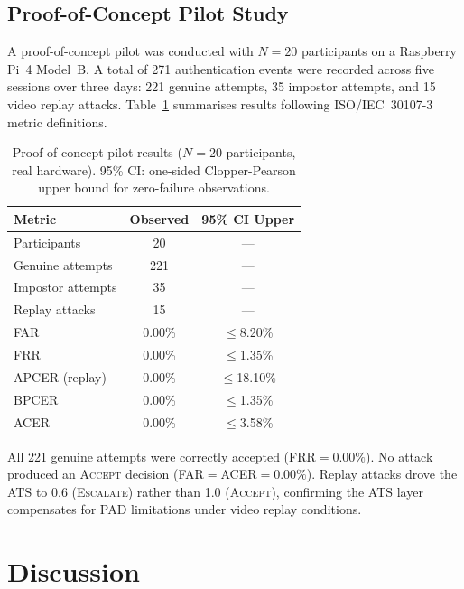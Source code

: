 \documentclass[submission]{sacjsub}
\begin{document}
\subsection{Proof-of-Concept Pilot Study}\label{sec:pilot}

A proof-of-concept pilot was conducted with \(N{=}20\) participants
on a Raspberry Pi~4 Model~B. A total of 271 authentication events were
recorded across five sessions over three days: 221 genuine attempts,
35 impostor attempts, and 15 video replay attacks.
Table~\ref{tab:pilot} summarises results following ISO/IEC~30107-3
metric definitions.

\begin{table}[t]
\caption{Proof-of-concept pilot results (\(N{=}20\) participants, real
  hardware). 95\% CI: one-sided Clopper-Pearson upper bound for
  zero-failure observations.}
\label{tab:pilot}
\begin{tabular}{|l|c|c|}
  \hline
  Metric & Observed & 95\% CI Upper \\
  \hline
  Participants       & 20          & --- \\
  Genuine attempts   & 221         & --- \\
  Impostor attempts  & 35          & --- \\
  Replay attacks     & 15          & --- \\
  \hline
  FAR                & 0.00\%  & \(\leq\)8.20\% \\
  FRR                & 0.00\%  & \(\leq\)1.35\% \\
  APCER (replay)     & 0.00\%  & \(\leq\)18.10\% \\
  BPCER              & 0.00\%  & \(\leq\)1.35\% \\
  ACER               & 0.00\%  & \(\leq\)3.58\% \\
  \hline
\end{tabular}
\end{table}

All 221 genuine attempts were correctly accepted (FRR\(=0.00\%\)).
No attack produced an \textsc{Accept} decision
(FAR\(=\)ACER\(=0.00\%\)). Replay attacks drove the ATS to 0.6
(\textsc{Escalate}) rather than 1.0 (\textsc{Accept}), confirming the
ATS layer compensates for PAD limitations under video replay conditions.

\section{Discussion}\label{sec:discussion}
\end{document}
